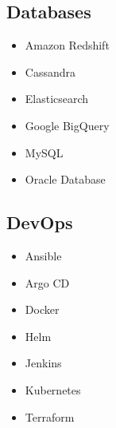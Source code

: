 \documentclass[letterpaper]{resume}
\begin{document}
\begin{minipage}[t]{0.25\columnwidth}
\sectionspace

\subsection{Databases}
\vspace{2pt}
\begin{itemize}
\item Amazon Redshift
\item Cassandra
\item Elasticsearch
\item Google BigQuery
\item MySQL
\item Oracle Database
\end{itemize}

\sectionspace

\subsection{DevOps}
\vspace{2pt}
\begin{itemize}
\item Ansible
\item Argo CD
\item Docker
\item Helm
\item Jenkins
\item Kubernetes
\item Terraform
\end{itemize}

\sectionspace

\end{minipage}
\hfill
\end{document}
